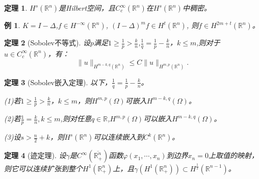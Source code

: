 \documentclass[a4paper]{ctexart}
\newtheorem{Example}{\hspace{2em}例}[section]
\newtheorem{Thm}{\hspace{2em}定理}[section]
\newcommand{\Rn}{\mathbb{R}^{n}}
\begin{document}
\begin{Thm}
    $H^{s}(\Rn)$是Hilbert空间，且$C_{c}^{\infty}(\Rn)$在$H^{s}(\Rn)$中稠密。
\end{Thm}
\begin{Example}
    $K=I-\varDelta$,$f\in H^{-\infty}(\Rn)$, $(I-\varDelta)^{m}f\in H^{t}(\Rn)$, 则$f\in H^{2m+t}(\Rn)$。
\end{Example}
\begin{Thm}[Sobolev不等式]
    设$p$满足$1\ge \frac{1}{p}>\frac{k}{n}$,$\frac{1}{q}=\frac{1}{p}-\frac{k}{n}$，$k\le m$,则对于$u\in C_{c}^{\infty}(\Rn)$，有：
    \begin{equation}
        \|u\|_{H^{m-k,q}(\Rn)}\le C\|u\|_{H^{m,p}(\Rn)}.
    \end{equation}
\end{Thm}
\begin{Thm}[Sobolev嵌入定理]
    以下，$\frac{1}{q}=\frac{1}{p}-\frac{k}{n}$。
    
    (1)若$1\ge\frac{1}{p}>\frac{k}{n}$，$k\le m$，则$H^{m,p}(\Omega)$可嵌入$H^{m-k,q}(\Omega)$。

    (2)若$\frac{1}{p}=\frac{k}{n},k\le m$,则对任意$q\in\mathbb{R}$,$H^{m,p}(\Omega)$可以嵌入$H^{m-k,q}(\Omega)$。

    (3)设$s>\frac{n}{2}+k$，则$H^{s}(\Rn)$可以连续嵌入到$C^{k}(\Rn)$。
\end{Thm}
\begin{Thm}[迹定理]
    设$\gamma$是$C^{\infty}(\overline{\Rn_{+}})$函数$\varphi(x_{1},\cdots,x_{n})$到边界$x_{n}=0$上取值的映射，则它可以连续扩张到整个$H^{1}(\Rn_{+})$上，且$\gamma(H^{1}(\Rn_{+}))
    \subset H^{\frac{1}{2}}(\mathbb{R}^{n-1})$。
\end{Thm}
\end{document}
